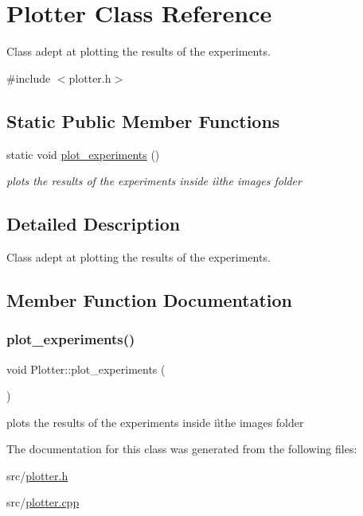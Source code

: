 \hypertarget{class_plotter}{}\section{Plotter Class Reference}
\label{class_plotter}


Class adept at plotting the results of the experiments.  




{\ttfamily \#include $<$plotter.\+h$>$}

\subsection*{Static Public Member Functions}
\begin{DoxyCompactItemize}
\item 
static void \mbox{\hyperlink{class_plotter_af025f4f67616c710d73498541cc1c08c}{plot\+\_\+experiments}} ()
\begin{DoxyCompactList}\small\item\em plots the results of the experiments inside iìthe images folder \end{DoxyCompactList}\end{DoxyCompactItemize}


\subsection{Detailed Description}
Class adept at plotting the results of the experiments. 

\subsection{Member Function Documentation}
\mbox{\label{class_plotter_af025f4f67616c710d73498541cc1c08c}} 
\subsubsection{\texorpdfstring{plot\+\_\+experiments()}{plot\_experiments()}}
{\footnotesize\ttfamily void Plotter\+::plot\+\_\+experiments (\begin{DoxyParamCaption}{ }\end{DoxyParamCaption})\hspace{0.3cm}{\ttfamily [static]}}



plots the results of the experiments inside iìthe images folder 



The documentation for this class was generated from the following files\+:\begin{DoxyCompactItemize}
\item 
src/\mbox{\hyperlink{plotter_8h}{plotter.\+h}}\item 
src/\mbox{\hyperlink{plotter_8cpp}{plotter.\+cpp}}\end{DoxyCompactItemize}
